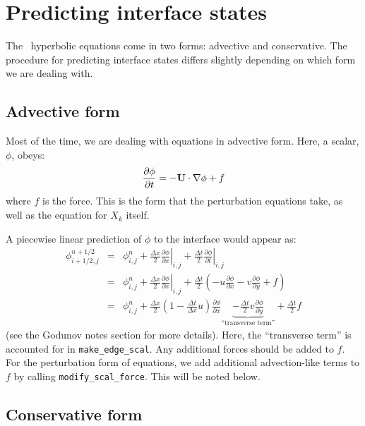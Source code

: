 
\section{Predicting interface states}

The \maestro\ hyperbolic equations come in two forms: advective and
conservative.  The procedure for predicting interface states differs
slightly depending on which form we are dealing with.

\subsection{Advective form}

Most of the time, we are dealing with equations in advective form.
Here, a scalar, $\phi$, obeys:
\begin{equation}
\frac{\partial \phi}{\partial t} = -{\bf U} \cdot \nabla \phi + f
\end{equation}
where $f$ is the force.  This is the form that the perturbation
equations take, as well as the equation for $X_k$ itself.

A piecewise linear prediction of $\phi$ to the interface 
would appear as:
\begin{eqnarray}
\phi_{i+1/2,j}^{n+1/2} &=& \phi_{i,j}^n 
    + \left . \frac{\Delta x}{2} \frac{\partial \phi}{\partial x} \right |_{i,j}
    + \left . \frac{\Delta t}{2} \frac{\partial \phi}{\partial t} \right |_{i,j} \\
 &=& \phi_{i,j}^n 
    + \left . \frac{\Delta x}{2} \frac{\partial \phi}{\partial x} \right |_{i,j}
    +  \frac{\Delta t}{2} \left ( -u \frac{\partial \phi}{\partial x} 
                                         -v \frac{\partial \phi}{\partial y} + f \right ) \\
 &=& \phi_{i,j}^n + \frac{\Delta x}{2} \left ( 1 - \frac{\Delta t}{\Delta x} u \right ) 
           \frac{\partial \phi}{\partial x} 
    \underbrace{- \frac{\Delta t}{2} v \frac{\partial \phi}{\partial y}}_{\text{``transverse~term''}} + \frac{\Delta t}{2} f
\end{eqnarray}
(see the Godunov notes section for more details).  Here, the
``transverse term'' is accounted for in {\tt make\_edge\_scal}.  Any
additional forces should be added to $f$.  For the perturbation form
of equations, we add additional advection-like terms to $f$ by calling
{\tt modify\_scal\_force}.  This will be noted below.

\subsection{Conservative form}

